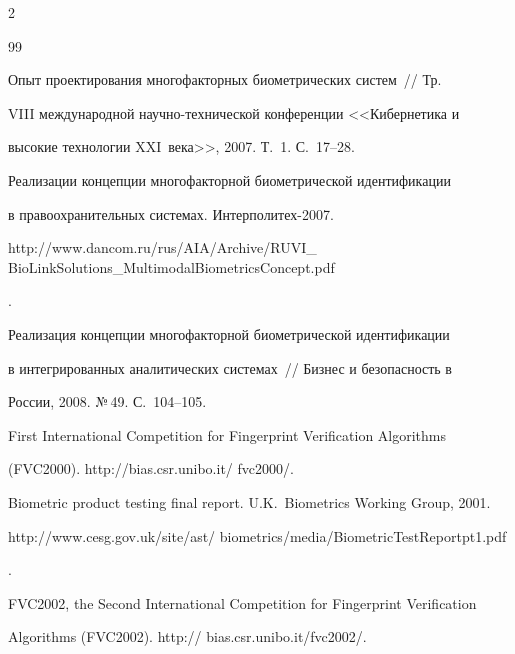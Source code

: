 \begin{multicols}{2}
{{\begin{thebibliography}{99}


Опыт проектирования многофакторных биометрических систем~// Тр.\ 

VIII международной научно-технической конференции <<Кибернетика и 

высокие технологии XXI~века>>, 2007.  Т.~1. С.~17--28.





Реализации концепции многофакторной биометрической идентификации 

в правоохранительных системах. Ин\-тер\-по\-ли\-тех-2007.  

{\sf  

http://www.dancom.ru/rus/AIA/Archive/RUVI\_ BioLinkSolutions\_MultimodalBiometricsConcept.pdf}.





Реализация концепции многофакторной биометрической идентификации 

в интегрированных аналитических системах~// Бизнес и безопасность в 

России,  2008. №\,49. С.~104--105.






First International Competition for Fingerprint Verification Algorithms 

(FVC2000). {\sf  http://bias.csr.unibo.it/ fvc2000/}.





Biometric product testing final report. U.K.\ Biometrics Working Group, 2001. 

{\sf 

http://www.cesg.gov.uk/site/ast/ \mbox{biometrics/media/BiometricTestReportpt1.pdf}}.




FVC2002, the Second International Competition for Fingerprint Verification 

Algorithms (FVC2002). {\sf http:// bias.csr.unibo.it/fvc2002/}.




\end{thebibliography}}}
\end{multicols}
